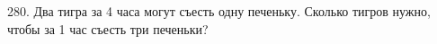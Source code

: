 280. Два тигра за 4 часа могут съесть одну печеньку. Сколько тигров нужно, чтобы за 1 час съесть три печеньки?\\
